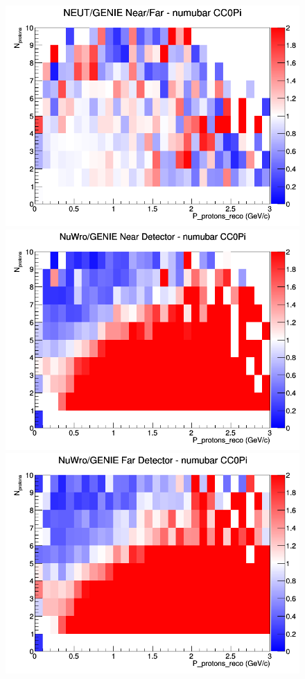 \begin{figure}[h]
\endminipage
{}
\includegraphics[width=\linewidth]{eff_N_P/LAr/protons/ratios/CC0Pi_NEUT_GENIE_numubar_NF_N_P.png}
\endminipage
\newline
{}
\includegraphics[width=\linewidth]{eff_N_P/LAr/protons/ratios/CC0Pi_NuWro_GENIE_numubar_near_N_P.png}
\endminipage
{}
\includegraphics[width=\linewidth]{eff_N_P/LAr/protons/ratios/CC0Pi_NuWro_GENIE_numubar_far_N_P.png}

\end{figure}
